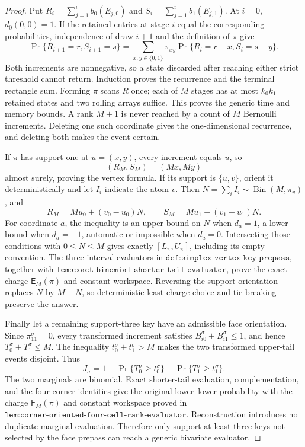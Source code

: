 \documentclass{article}
\begin{document}
\begin{proof}
Put \(R_i=\sum_{j=1}^i b_0(E_{j,0})\) and \(S_i=\sum_{j=1}^i b_1(E_{j,1})\). At \(i=0\), \(d_0(0,0)=1\). If the retained entries at stage \(i\) equal the corresponding probabilities, independence of draw \(i+1\) and the definition of \(\pi\) give
\[
\Pr\{R_{i+1}=r,S_{i+1}=s\}
=\sum_{x,y\in\{0,1\}}\pi_{xy}
 \Pr\{R_i=r-x,S_i=s-y\}.
\tag{1}
\]
Both increments are nonnegative, so a state discarded after reaching either strict threshold cannot return. Induction proves the recurrence and the terminal rectangle sum. Forming \(\pi\) scans \(R\) once; each of \(M\) stages has at most \(k_0k_1\) retained states and two rolling arrays suffice. This proves the generic time and memory bounds. A rank \(M+1\) is never reached by a count of \(M\) Bernoulli increments. Deleting one such coordinate gives the one-dimensional recurrence, and deleting both makes the event certain.

If \(\pi\) has support one at \(u=(x,y)\), every increment equals \(u\), so
\[
(R_M,S_M)=(Mx,My)
\]
almost surely, proving the vertex formula. If its support is \(\{u,v\}\), orient it deterministically and let \(I_i\) indicate the atom \(v\). Then
\(N=\sum_i I_i\sim\operatorname{Bin}(M,\pi_v)\), and
\[
R_M=Mu_0+(v_0-u_0)N,\qquad
S_M=Mu_1+(v_1-u_1)N.
\tag{2}
\]
For coordinate \(a\), the inequality is an upper bound on \(N\) when
\(d_a=1\), a lower bound when \(d_a=-1\), automatic or impossible when
\(d_a=0\). Intersecting those conditions with \(0\le N\le M\) gives exactly
\([L_\pi,U_\pi]\), including its empty convention. The three interval evaluators in
\(\texttt{def:simplex-vertex-key-prepass}\), together with
\(\texttt{lem:exact-binomial-shorter-tail-evaluator}\), prove the exact charge
\(\mathsf E_M(\pi)\) and constant workspace. Reversing the support orientation replaces \(N\) by \(M-N\), so deterministic least-charge choice and tie-breaking preserve the answer.

Finally let a remaining support-three key have an admissible face orientation. Since \(\pi^\sigma_{11}=0\), every transformed increment satisfies \(B_{i0}^\sigma+B_{i1}^\sigma\le1\), and hence
\(T_0^\sigma+T_1^\sigma\le M\). The inequality
\(t_0^\sigma+t_1^\sigma>M\) makes the two transformed upper-tail events disjoint. Thus
\[
J_\sigma=1-\Pr\{T_0^\sigma\ge t_0^\sigma\}
-\Pr\{T_1^\sigma\ge t_1^\sigma\}.
\tag{3}
\]
The two marginals are binomial. Exact shorter-tail evaluation, complementation, and the four corner identities give the original lower--lower probability with the charge \(\mathsf F_M(\pi)\) and constant workspace proved in
\(\texttt{lem:corner-oriented-four-cell-rank-evaluator}\). Reconstruction introduces no duplicate marginal evaluation. Therefore only support-at-least-three keys not selected by the face prepass can reach a generic bivariate evaluator.


\end{proof}
\end{document}
